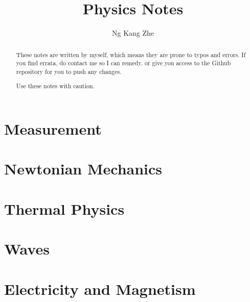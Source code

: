 \documentclass[a4paper,10pt]{article}
\title{Physics Notes}
\author{Ng Kang Zhe}
\begin{document}
\maketitle

\begin{abstract}
	These notes are written by myself, which means they are prone to typos and errors. If you find errata, do contact me so I can remedy. or give you access to the Github repository for you to push any changes.
	
	Use these notes with caution.
\end{abstract}

\begin{multicols}{2}
\tableofcontents
\end{multicols}

\newpage
\begin{multicols*}{2}
\part{Measurement}


\part{Newtonian Mechanics}







\part{Thermal Physics}





\part{Waves}





\part{Electricity and Magnetism}



\end{multicols*}
\end{document}
